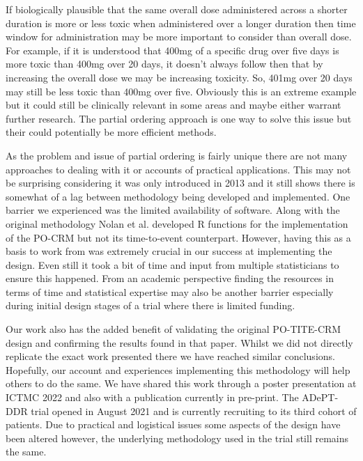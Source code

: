 If biologically plausible that the same overall dose administered across a shorter duration is more or less toxic when administered over a longer duration then time window for administration may be more important to consider than overall dose. For example, if it is understood that 400mg of a specific drug over five days is more toxic than 400mg over 20 days, it doesn't always follow then that by increasing the overall dose we may be increasing toxicity. So, 401mg over 20 days may still be less toxic than 400mg over five. Obviously this is an extreme example but it could still be clinically relevant in some areas and maybe either warrant further research. The partial ordering approach is one way to solve this issue but their could potentially be more efficient methods.  

As the problem and issue of partial ordering is fairly unique there are not many approaches to dealing with it or accounts of practical applications. This may not be surprising considering it was only introduced in 2013 and it still shows there is somewhat of a lag between methodology being developed and implemented. One barrier we experienced was the limited availability of software. Along with the original methodology Nolan et al. \cite{wagesPocrmRpackagePhase2013, wagesPocrmDoseFinding2019} developed R functions for the implementation of the PO-CRM but not its time-to-event counterpart. However, having this as a basis to work from was extremely crucial in our success at implementing the design. Even still it took a bit of time and input from multiple statisticians to ensure this happened. From an academic perspective finding the resources in terms of time and statistical expertise may also be another barrier especially during initial design stages of a trial where there is limited funding. 

Our work also has the added benefit of validating the original PO-TITE-CRM design and confirming the results found in that paper. Whilst we did not directly replicate the exact work presented there we have reached similar conclusions. Hopefully, our account and experiences implementing this methodology will help others to do the same. We have shared this work through a poster presentation at ICTMC 2022 \cite{ICTMC20226th} and also with a publication currently in pre-print. The ADePT-DDR trial opened in August 2021 and is currently recruiting to its third cohort of patients. Due to practical and logistical issues some aspects of the design have been altered however, the underlying methodology used in the trial still remains the same. 

